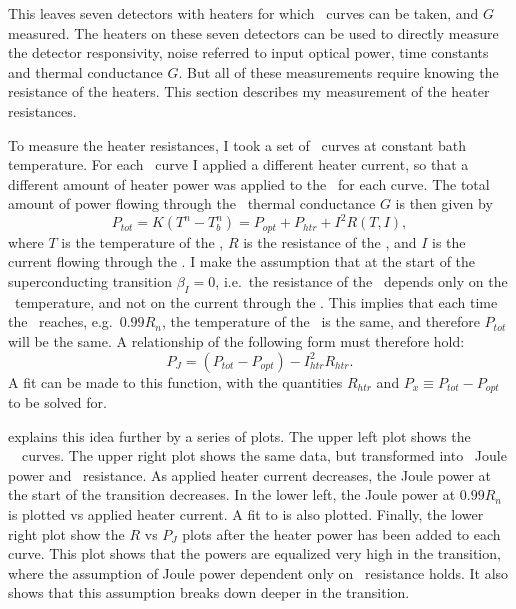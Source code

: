 This leaves seven detectors with heaters for which \IV\ curves can be taken, and $G$ measured.
The heaters on these seven detectors can be used to directly measure the detector responsivity, noise referred to input optical power, time constants and thermal conductance $G$.
But all of these measurements require knowing the resistance of the heaters.
This section describes my measurement of the heater resistances.

To measure the heater resistances, I took a set of \IV\ curves at constant bath temperature.
For each \IV\ curve I applied a different heater current, so that a different amount of heater power was applied to the \TES\ for each curve.
The total amount of power flowing through the \TES\ thermal conductance $G$ is then given by
\begin{equation}\label{eqn:tes-ptot}
P_{tot} = K(T^n - T_b^n) = P_{opt} + P_{htr} + I^2 R(T,I),
\end{equation}
where $T$ is the temperature of the \TES, $R$ is the resistance of the \TES, and $I$ is the current flowing through the \TES.
I make the assumption that at the start of the superconducting transition $\beta_I = 0$, i.e.\ the resistance of the \TES\ depends only on the \TES\ temperature, and not on the current through the \TES.
This implies that each time the \TES\ reaches, e.g.\ $0.99R_n$, the temperature of the \TES\ is the same, and therefore $P_{tot}$ will be the same.
A relationship of the following form must therefore hold:
\begin{equation}\label{eqn:rhtr-fit}
P_{J} = (P_{tot} - P_{opt}) - I_{htr}^2 R_{htr}.
\end{equation}
A fit can be made to this function, with the quantities $R_{htr}$ and $P_{x} \equiv P_{tot} - P_{opt}$ to be solved for.

 explains this idea further by a series of plots.
The upper left plot shows the \TES\ \IV\ curves.
The upper right plot shows the same data, but transformed into \TES\ Joule power and \TES\ resistance.
As applied heater current decreases, the Joule power at the start of the transition decreases.
In the lower left, the Joule power at $0.99R_{n}$ is plotted vs applied heater current.
A fit to  is also plotted.
Finally, the lower right plot show the $R$ vs $P_J$ plots after the heater power has been added to each curve.
This plot shows that the powers are equalized very high in the transition, where the assumption of Joule power dependent only on \TES\ resistance holds.
It also shows that this assumption breaks down deeper in the transition.

